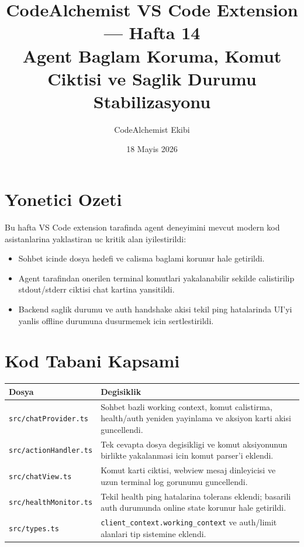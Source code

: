 \documentclass[12pt,a4paper]{article}
\title{\textbf{CodeAlchemist VS Code Extension --- Hafta 14} \\
\large Agent Baglam Koruma, Komut Ciktisi ve Saglik Durumu Stabilizasyonu}
\author{CodeAlchemist Ekibi}
\date{18 Mayis 2026}
\begin{document}
\maketitle
\tableofcontents
\newpage

\section{Yonetici Ozeti}

Bu hafta VS Code extension tarafinda agent deneyimini mevcut modern kod asistanlarina yaklastiran uc kritik alan iyilestirildi:

\begin{itemize}[leftmargin=2em]
  \item Sohbet icinde dosya hedefi ve calisma baglami korunur hale getirildi.
  \item Agent tarafindan onerilen terminal komutlari yakalanabilir sekilde calistirilip stdout/stderr ciktisi chat kartina yansitildi.
  \item Backend saglik durumu ve auth handshake akisi tekil ping hatalarinda UI'yi yanlis offline durumuna dusurmemek icin sertlestirildi.
\end{itemize}

\section{Kod Tabani Kapsami}

\begin{tabularx}{\textwidth}{@{}lX@{}}
\toprule
\textbf{Dosya} & \textbf{Degisiklik} \\
\midrule
\texttt{src/chatProvider.ts} & Sohbet bazli working context, komut calistirma, health/auth yeniden yayinlama ve aksiyon karti akisi guncellendi. \\
\texttt{src/actionHandler.ts} & Tek cevapta dosya degisikligi ve komut aksiyonunun birlikte yakalanmasi icin komut parser'i eklendi. \\
\texttt{src/chatView.ts} & Komut karti ciktisi, webview mesaj dinleyicisi ve uzun terminal log gorunumu guncellendi. \\
\texttt{src/healthMonitor.ts} & Tekil health ping hatalarina tolerans eklendi; basarili auth durumunda online state korunur hale getirildi. \\
\texttt{src/types.ts} & \texttt{client\_context.working\_context} ve auth/limit alanlari tip sistemine eklendi. \\
\bottomrule
\end{tabularx}
\end{document}
